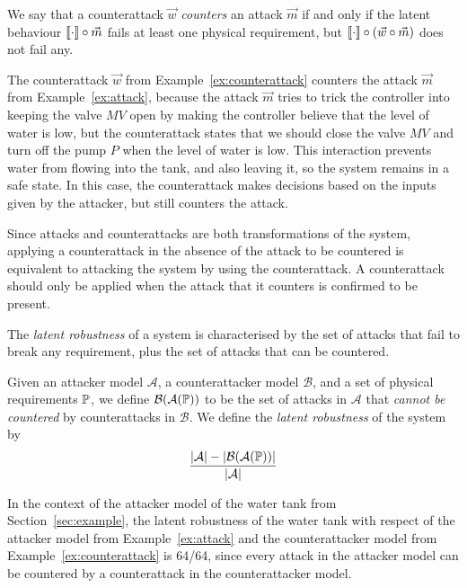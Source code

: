 {{\begin{definition}
  We say that a counterattack $\vec{w}$ \emph{counters} an attack $\vec{m}$ if and only if the latent behaviour ${{{\llbracket\cdot\rrbracket}}}\circ\vec{m}$ fails at least one physical requirement, but ${{{\llbracket\cdot\rrbracket}}}\circ(\vec{w}\circ\vec{m})$ does not fail any.
\end{definition}
\begin{example}
  The counterattack $\vec{w}$ from Example~\ref{ex:counterattack} counters the attack $\vec{m}$ from Example~\ref{ex:attack}, because the attack $\vec{m}$ tries to trick the controller into keeping the valve $MV$ open by making the controller believe that the level of water is low, but the counterattack states that we should close the valve $MV$ and turn off the pump $P$ when the level of water is low. This interaction prevents water from flowing into the tank, and also leaving it, so the system remains in a safe state. In this case, the counterattack makes decisions based on the inputs given by the attacker, but still counters the attack.
\end{example}
Since attacks and counterattacks are both transformations of the system, applying a counterattack in the absence of the attack to be countered is equivalent to attacking the system by using the counterattack. A counterattack should only be applied when the attack that it counters is confirmed to be present. 

The \emph{latent robustness} of a system is characterised by the set of attacks that fail to break any requirement, plus the set of attacks that can be countered.
\begin{definition}
  \label{def:LatentRobustness}
  Given an attacker model $\mathcal{A}$, a counterattacker model $\mathcal{B}$, and a set of physical requirements $\mathbb{P}$, we define $\mathcal{B}(\mathcal{A}(\mathbb{P}))$ to be the set of attacks in $\mathcal{A}$ that \emph{cannot be countered} by counterattacks in $\mathcal{B}$. We define the \emph{latent robustness} of the system by 
  \begin{align*}
    \frac{|\mathcal{A}|-|\mathcal{B}(\mathcal{A}(\mathbb{P}))|}{|\mathcal{A}|}
  \end{align*}
\end{definition}

\begin{example}
  In the context of the attacker model of the water tank from Section~\ref{sec:example}, the latent robustness of the water tank with respect of the attacker model from Example~\ref{ex:attack} and the counterattacker model from Example~\ref{ex:counterattack} is 64/64, since every attack in the attacker model can be countered by a counterattack in the counterattacker model.
\end{example}

}}
